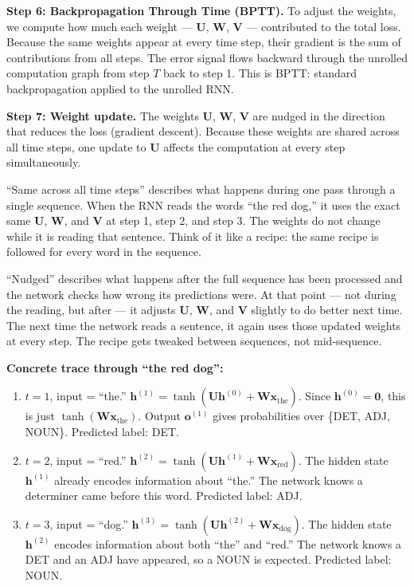 \documentclass[12pt,a4paper]{article}
\begin{document}
\medskip
\noindent\textbf{Step 6: Backpropagation Through Time (BPTT).}
To adjust the weights, we compute how much each weight --- $\mathbf{U}$, $\mathbf{W}$,
$\mathbf{V}$ --- contributed to the total loss. Because the same weights appear at every
time step, their gradient is the sum of contributions from all steps. The error signal
flows backward through the unrolled computation graph from step $T$ back to step 1.
This is BPTT: standard backpropagation applied to the unrolled RNN.

\medskip
\noindent\textbf{Step 7: Weight update.}
The weights $\mathbf{U}$, $\mathbf{W}$, $\mathbf{V}$ are nudged in the direction that
reduces the loss (gradient descent). Because these weights are shared across all time
steps, one update to $\mathbf{U}$ affects the computation at every step simultaneously.

``Same across all time steps'' describes what happens during one pass through a single
sequence. When the RNN reads the words ``the red dog,'' it uses the exact same
$\mathbf{U}$, $\mathbf{W}$, and $\mathbf{V}$ at step 1, step 2, and step 3. The weights
do not change while it is reading that sentence. Think of it like a recipe: the same
recipe is followed for every word in the sequence.

``Nudged'' describes what happens after the full sequence has been processed and the
network checks how wrong its predictions were. At that point --- not during the reading,
but after --- it adjusts $\mathbf{U}$, $\mathbf{W}$, and $\mathbf{V}$ slightly to do
better next time. The next time the network reads a sentence, it again uses those updated
weights at every step. The recipe gets tweaked between sequences, not mid-sequence.

\medskip
\noindent\textbf{Concrete trace through ``the red dog'':}

\begin{enumerate}
  \item $t = 1$, input = ``the.''
        $\mathbf{h}^{(1)} = \tanh(\mathbf{U}\mathbf{h}^{(0)} + \mathbf{W}\mathbf{x}_{\text{the}})$.
        Since $\mathbf{h}^{(0)} = \mathbf{0}$, this is just
        $\tanh(\mathbf{W}\mathbf{x}_{\text{the}})$.
        Output $\mathbf{o}^{(1)}$ gives probabilities over \{DET, ADJ, NOUN\}.
        Predicted label: DET.

  \item $t = 2$, input = ``red.''
        $\mathbf{h}^{(2)} = \tanh(\mathbf{U}\mathbf{h}^{(1)} + \mathbf{W}\mathbf{x}_{\text{red}})$.
        The hidden state $\mathbf{h}^{(1)}$ already encodes information about ``the.''
        The network knows a determiner came before this word.
        Predicted label: ADJ.

  \item $t = 3$, input = ``dog.''
        $\mathbf{h}^{(3)} = \tanh(\mathbf{U}\mathbf{h}^{(2)} + \mathbf{W}\mathbf{x}_{\text{dog}})$.
        The hidden state $\mathbf{h}^{(2)}$ encodes information about both ``the'' and
        ``red.'' The network knows a DET and an ADJ have appeared, so a NOUN is expected.
        Predicted label: NOUN.
\end{enumerate}
\end{document}
